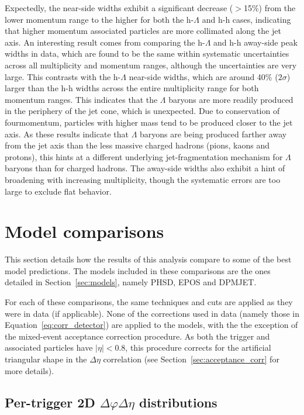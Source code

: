 Expectedly, the near-side widths exhibit a significant decrease ($>$15\%) from the lower momentum range to the higher for both the h-$\Lambda$ and h-h cases, indicating that higher momentum associated particles are more collimated along the jet axis. An interesting result comes from comparing the h-$\Lambda$ and h-h away-side peak widths in data, which are found to be the same within systematic uncertainties across all multiplicity and momentum ranges, although the uncertainties are very large. This contrasts with the h-$\Lambda$ near-side widths, which are around 40\% ($2\sigma$) larger than the h-h widths across the entire multiplicity range for both momentum ranges. This indicates that the $\Lambda$ baryons are more readily produced in the periphery of the jet cone, which is unexpected. Due to conservation of fourmomentum, particles with higher mass tend to be produced closer to the jet axis. As these results indicate that $\Lambda$ baryons are being produced farther away from the jet axis than the less massive charged hadrons (pions, kaons and protons), this hints at a different underlying jet-fragmentation mechanism for $\Lambda$ baryons than for charged hadrons. The away-side widths also exhibit a hint of broadening with increasing multiplicity, though the systematic errors are too large to exclude flat behavior.


\clearpage

\section{Model comparisons}
\label{sec:model_comparisons}
This section details how the results of this analysis compare to some of the best \pPb model predictions. The models included in these comparisons are the ones detailed in Section~\ref{sec:models}, namely PHSD, EPOS and DPMJET.

For each of these comparisons, the same techniques and cuts are applied as they were in data (if applicable).  None of the corrections used in data (namely those in Equation~\ref{eq:corr_detector}) are applied to the models, with the the exception of the mixed-event acceptance correction procedure. As both the trigger and associated particles have $|\eta| < 0.8$, this procedure corrects for the artificial triangular shape in the $\Delta\eta$ correlation (see Section~\ref{sec:acceptance_corr} for more details).

\subsection{Per-trigger 2D $\Delta\varphi\Delta\eta$ distributions}
\label{sec:model_2d_correlations}

